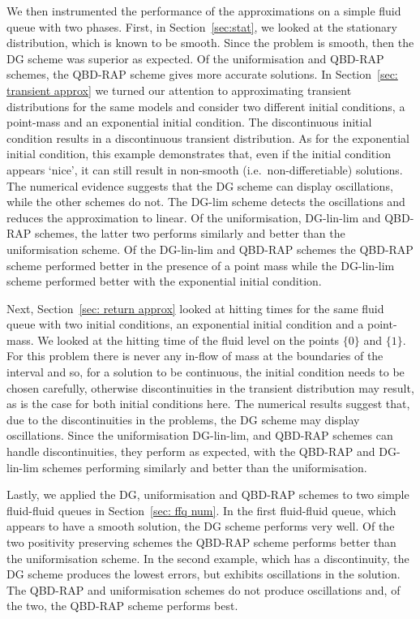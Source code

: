 We then instrumented the performance of the approximations on a simple fluid queue with two phases. First, in Section~\ref{sec:stat}, we looked at the stationary distribution, which is known to be smooth. Since the problem is smooth, then the DG scheme was superior as expected. Of the uniformisation and QBD-RAP schemes, the QBD-RAP scheme gives more accurate solutions. In Section~\ref{sec: transient approx} we turned our attention to approximating transient distributions for the same models and consider two different initial conditions, a point-mass and an exponential initial condition. The discontinuous initial condition results in a discontinuous transient distribution. As for the exponential initial condition, this example demonstrates that, even if the initial condition appears `nice', it can still result in non-smooth (i.e.~non-differetiable) solutions. The numerical evidence suggests that the DG scheme can display oscillations, while the other schemes do not. The DG-lim scheme detects the oscillations and reduces the approximation to linear. Of the uniformisation, DG-lin-lim and QBD-RAP schemes, the latter two performs similarly and better than the uniformisation scheme. Of the DG-lin-lim and QBD-RAP schemes the QBD-RAP scheme performed better in the presence of a point mass while the DG-lin-lim scheme performed better with the exponential initial condition.

Next, Section~\ref{sec: return approx} looked at hitting times for the same fluid queue with two initial conditions, an exponential initial condition and a point-mass. We looked at the hitting time of the fluid level on the points \(\{0\}\) and \(\{1\}\). For this problem there is never any in-flow of mass at the boundaries of the interval and so, for a solution to be continuous, the initial condition needs to be chosen carefully, otherwise discontinuities in the transient distribution may result, as is the case for both initial conditions here. The numerical results suggest that, due to the discontinuities in the problems, the DG scheme may display oscillations. Since the uniformisation DG-lin-lim, and QBD-RAP schemes can handle discontinuities, they perform as expected, with the QBD-RAP and DG-lin-lim schemes performing similarly and better than the uniformisation. 

Lastly, we applied the DG, uniformisation and QBD-RAP schemes to two simple fluid-fluid queues in Section~\ref{sec: ffq num}. In the first fluid-fluid queue, which appears to have a smooth solution, the DG scheme performs very well. Of the two positivity preserving schemes the QBD-RAP scheme performs better than the uniformisation scheme. In the second example, which has a discontinuity, the DG scheme produces the lowest errors, but exhibits oscillations in the solution. The QBD-RAP and uniformisation schemes do not produce oscillations and, of the two, the QBD-RAP scheme performs best. 

